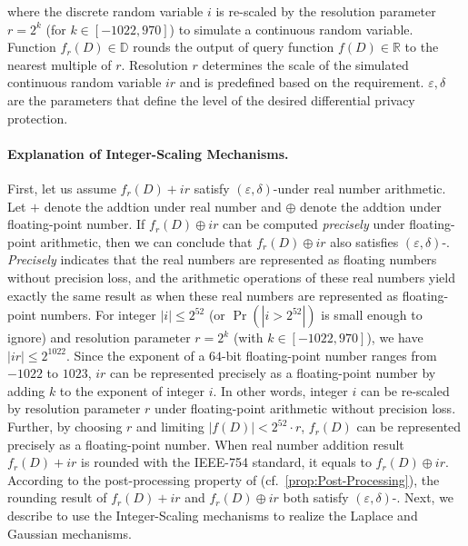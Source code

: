 where the discrete random variable $i $ is re-scaled by the resolution parameter $r=2^k$ (for $k \in \left[-1022,970\right] $) to simulate a continuous random variable.
Function $f_r\left(D\right)\in\mathbb{D} $ rounds the output of query function $f\left(D\right)\in\mathbb{R} $ to the nearest multiple of $r$.
Resolution $r$ determines the scale of the simulated continuous random variable $ir$ and is predefined based on the requirement.
$\varepsilon, \delta$ are the parameters that define the level of the desired differential privacy protection.

\paragraph{Explanation of Integer-Scaling Mechanisms.}
\label{para:MainIdeaofInteger-ScalingMechanism}
First, let us assume $f_r\left(D\right) +ir$ satisfy $\left(\varepsilon, \delta\right) $-\differentialprivacy under real number arithmetic. Let $+$ denote the addtion under real number and $\oplus$ denote the addtion under floating-point number.
If $f_r\left(D\right) \oplus ir$ can be computed \textit{precisely} under floating-point arithmetic, then we can conclude that $f_r\left(D\right) \oplus ir$ also satisfies $\left(\varepsilon, \delta\right) $-\differentialprivacy. \textit{Precisely} indicates that the real numbers are represented as floating numbers without precision loss, and the arithmetic operations of these real numbers yield exactly the same result as when these real numbers are represented as floating-point numbers.
For integer $\left\lvert i\right\rvert \leq2^{52}$ (or $\Pr\left(\left\lvert i>2^{52}\right\rvert \right) $ is small enough to ignore) and resolution parameter $r=2^{k}$ (with $k \in \left[-1022,970\right] $), we have $    \left\lvert ir\right\rvert  \leq 2^{1022}$. Since the exponent of a $64$-bit floating-point number ranges from $-1022$ to $1023$, $ir$ can be represented precisely as a floating-point number by adding $k$ to the exponent of integer $i$.
In other words, integer $i$ can be re-scaled by resolution parameter $r$ under floating-point arithmetic without precision loss.
Further, by choosing $r$ and limiting $\left\lvert f\left(D\right)\right\rvert< 2^{52}\cdot r  $, $f_r\left(D\right) $ can be represented precisely as a floating-point number.
When real number addition result $f_r\left(D\right) +ir$ is rounded with the IEEE-754 standard, it equals to $f_r\left(D\right) \oplus ir$. According to the post-processing property of \differentialprivacy (cf.~\autoref{prop:Post-Processing}), the rounding result of $f_r\left(D\right) +ir$ and $f_r\left(D\right) \oplus ir$ both satisfy $\left(\varepsilon, \delta\right)$-\differentialprivacy. Next, we describe to use the Integer-Scaling mechanisms to realize the Laplace and Gaussian mechanisms.

